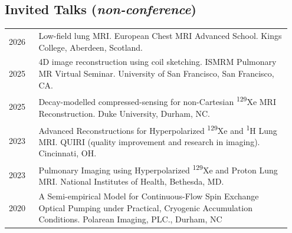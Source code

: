 \documentclass[12pt,]{scrartcl}
\begin{document}


\newpage
\subsection{Invited Talks (\textit{non-conference})}\label{presentations-and-talks}

\begin{table}[!h]
{\def\arraystretch{1.5}\tabcolsep=0pt
\begin{tabular}{p{0.10\linewidth}p{0.85\linewidth}}

    2026 & Low-field lung MRI. European Chest MRI Advanced School. Kings College, Aberdeen, Scotland. \\

    2025 & 4D image reconstruction using coil sketching. ISMRM Pulmonary MR Virtual Seminar. University of San Francisco, San Francisco, CA. \\

    2025 & Decay-modelled compressed-sensing for non-Cartesian \textsuperscript{129}Xe MRI Reconstruction. Duke University, Durham, NC. \\
  
  2023 & Advanced Reconstructions for Hyperpolarized \textsuperscript{129}Xe and \textsuperscript{1}H Lung MRI. QUIRI (quality improvement and research in imaging). Cincinnati, OH. \\

  2023 & Pulmonary Imaging using Hyperpolarized \textsuperscript{129}Xe and Proton Lung MRI. National Institutes of Health, Bethesda, MD. \\

  2020 & A Semi-empirical Model for Continuous-Flow Spin Exchange Optical Pumping under Practical, Cryogenic Accumulation Conditions. Polarean Imaging, PLC., Durham, NC \\

    
  
\end{tabular}%
}
\end{table}
\end{document}
